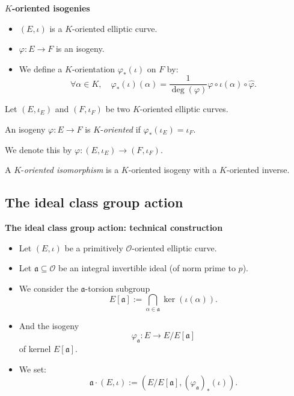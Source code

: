 \documentclass[10pt]{beamer}
\theoremstyle{plain}
\theoremstyle{definition}
\newcommand{\mO}{\mathcal{O}}
\renewcommand{\(}{\left(}
\renewcommand{\)}{\right)}
\newcommand{\mf}[1]{\mathfrak{#1}}
\begin{document}
\begin{frame}
\textbf{$K$-oriented isogenies}

\vspace{0.5cm}

\begin{itemize}
\item $(E, \iota)$ is a $K$-oriented elliptic curve. 
\item $\varphi : E\longrightarrow F$ is an isogeny.
\item We define a $K$-orientation $\varphi_*(\iota)$ on $F$ by:
\[\forall \alpha\in K,  \quad \varphi_*(\iota)(\alpha)=\frac{1}{\deg(\varphi)}\varphi\circ \iota(\alpha)\circ \widehat{\varphi}.\]
\end{itemize}

\pause

\begin{definition}
Let $(E, \iota_E)$ and $(F,\iota_F)$ be two $K$-oriented elliptic curves.  

An isogeny $\varphi : E\longrightarrow F$ is $K$-\emph{oriented} if $\varphi_*(\iota_E)=\iota_F$.  

We denote this by $\varphi : (E, \iota_E)\longrightarrow(F,\iota_F)$.

\pause

A $K$-\emph{oriented isomorphism} is a $K$-oriented isogeny with a $K$-oriented inverse.
\end{definition}

\end{frame}


\subsection{The ideal class group action}

\begin{frame}

\textbf{The ideal class group action: technical construction}

\vspace{0.5cm}

\begin{itemize}
\item Let $(E,\iota)$ be a primitively $\mO$-oriented elliptic curve. 
\item Let $\mf{a}\subseteq\mO$ be an integral invertible ideal (of norm prime to $p$).

\pause 
\item We consider the $\mf{a}$-torsion subgroup
\[E[\mf{a}]:=\bigcap_{\alpha\in\mf{a}}\ker(\iota(\alpha)).\]

\pause
\item And the isogeny
\[\varphi_{\mf{a}}:E\longrightarrow E/E[\mf{a}]\]
of kernel $E[\mf{a}]$.

\pause
\item We set:
\[\mf{a}\cdot (E,\iota):=(E/E[\mf{a}],(\varphi_{\mf{a}})_*(\iota)).\]
\end{itemize}

\end{frame}
\end{document}
